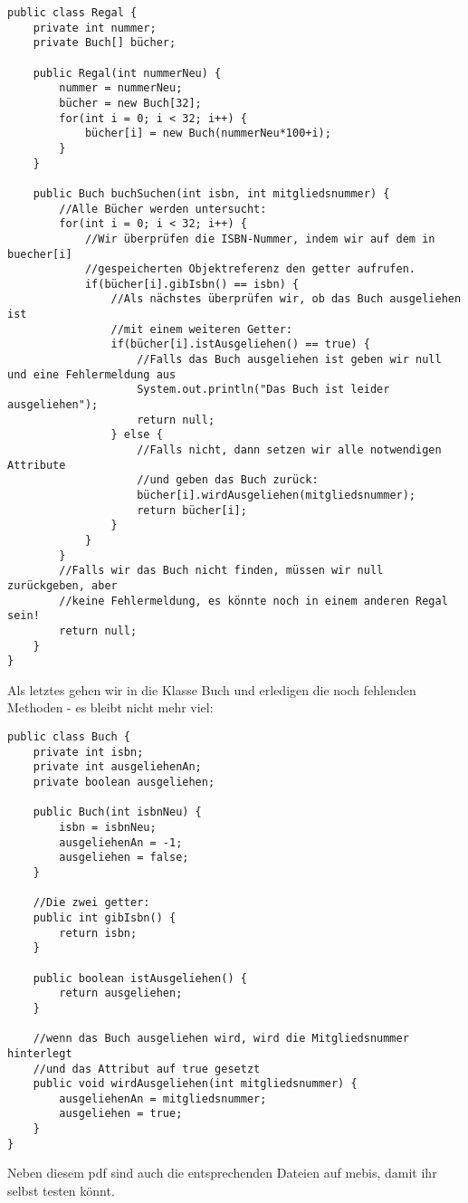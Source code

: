 \documentclass{article}
\begin{document}
\begin{verbatim}
public class Regal {
    private int nummer;
    private Buch[] bücher;

    public Regal(int nummerNeu) {
        nummer = nummerNeu;
        bücher = new Buch[32];
        for(int i = 0; i < 32; i++) {
            bücher[i] = new Buch(nummerNeu*100+i);
        }
    } 

    public Buch buchSuchen(int isbn, int mitgliedsnummer) {
        //Alle Bücher werden untersucht:
        for(int i = 0; i < 32; i++) {
            //Wir überprüfen die ISBN-Nummer, indem wir auf dem in buecher[i]
            //gespeicherten Objektreferenz den getter aufrufen.
            if(bücher[i].gibIsbn() == isbn) {
                //Als nächstes überprüfen wir, ob das Buch ausgeliehen ist 
                //mit einem weiteren Getter:
                if(bücher[i].istAusgeliehen() == true) {
                    //Falls das Buch ausgeliehen ist geben wir null und eine Fehlermeldung aus
                    System.out.println("Das Buch ist leider ausgeliehen");
                    return null;
                } else {
                    //Falls nicht, dann setzen wir alle notwendigen Attribute 
                    //und geben das Buch zurück:
                    bücher[i].wirdAusgeliehen(mitgliedsnummer);
                    return bücher[i];
                }
            } 
        }
        //Falls wir das Buch nicht finden, müssen wir null zurückgeben, aber 
        //keine Fehlermeldung, es könnte noch in einem anderen Regal sein!
        return null;
    }
}
\end{verbatim}

Als letztes gehen wir in die Klasse Buch und erledigen die noch fehlenden Methoden - es bleibt nicht mehr viel:

\begin{verbatim}
public class Buch {
    private int isbn;
    private int ausgeliehenAn;
    private boolean ausgeliehen;

    public Buch(int isbnNeu) {
        isbn = isbnNeu;
        ausgeliehenAn = -1;
        ausgeliehen = false;
    }

    //Die zwei getter:
    public int gibIsbn() {
        return isbn;
    }
    
    public boolean istAusgeliehen() {
        return ausgeliehen;
    }
    
    //wenn das Buch ausgeliehen wird, wird die Mitgliedsnummer hinterlegt
    //und das Attribut auf true gesetzt
    public void wirdAusgeliehen(int mitgliedsnummer) {
        ausgeliehenAn = mitgliedsnummer;
        ausgeliehen = true;
    }
}
\end{verbatim}

Neben diesem pdf sind auch die entsprechenden Dateien auf mebis, damit ihr selbst testen könnt. 
\end{document}
